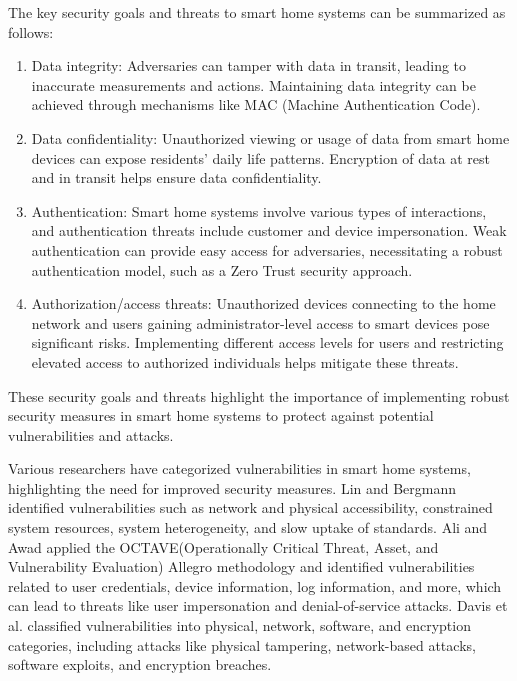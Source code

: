 The key security goals and threats to smart home systems can be summarized as follows:
\begin{enumerate}
    \item  Data integrity: Adversaries can tamper with data in transit, leading to inaccurate measurements and actions. Maintaining data integrity can be achieved through mechanisms like MAC (Machine Authentication Code).

\item Data confidentiality: Unauthorized viewing or usage of data from smart home devices can expose residents' daily life patterns. Encryption of data at rest and in transit helps ensure data confidentiality.

\item Authentication: Smart home systems involve various types of interactions, and authentication threats include customer and device impersonation. Weak authentication can provide easy access for adversaries, necessitating a robust authentication model, such as a Zero Trust security approach.

\item Authorization/access threats: Unauthorized devices connecting to the home network and users gaining administrator-level access to smart devices pose significant risks. Implementing different access levels for users and restricting elevated access to authorized individuals helps mitigate these threats.
\end{enumerate}
These security goals and threats highlight the importance of implementing robust security measures in smart home systems to protect against potential vulnerabilities and attacks.

Various researchers have categorized vulnerabilities in smart home systems, highlighting the need for improved security measures. Lin and Bergmann identified vulnerabilities such as network and physical accessibility, constrained system resources, system heterogeneity, and slow uptake of standards. Ali and Awad applied the OCTAVE(Operationally Critical Threat, Asset, and Vulnerability Evaluation) Allegro methodology and identified vulnerabilities related to user credentials, device information, log information, and more, which can lead to threats like user impersonation and denial-of-service attacks. Davis et al. classified vulnerabilities into physical, network, software, and encryption categories, including attacks like physical tampering, network-based attacks, software exploits, and encryption breaches.


